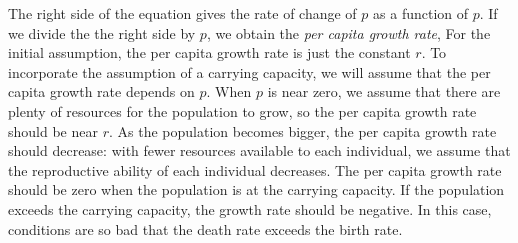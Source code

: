 \documentclass[reqno]{immbook}
\numberwithin{equation}{chapter}
\numberwithin{question}{section}
\numberwithin{theorem}{chapter}
\numberwithin{figure}{chapter}
\theoremstyle{definition}
\begin{document}
The right side of the equation gives the rate of change of $p$
as a function of $p$.
If we divide the the right side by $p$, we obtain the
\emph{per capita growth rate},
For the initial assumption,
the per capita growth rate  is just the constant $r$.
To incorporate the assumption of a carrying capacity, we will assume that the
per capita growth rate depends on $p$.
When $p$ is near zero, we assume that there
are plenty of resources for the population to grow, so the
per capita growth rate should be
near $r$.  As the population becomes bigger, the per capita growth rate
should decrease: with fewer resources available to each individual,
we assume that the reproductive ability of each individual decreases.
The per capita growth rate
should be zero when the population is at the carrying capacity.
If the population exceeds the carrying capacity, the growth rate should
be negative. In this case, conditions are so bad that the death rate
exceeds the birth rate.
\end{document}
